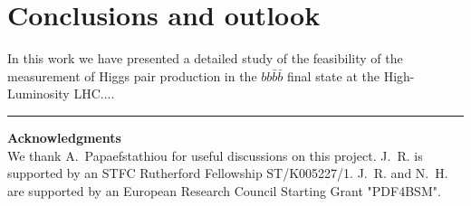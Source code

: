 \section{Conclusions and outlook}
\label{sec:conclusions}

In this work we have presented a detailed study of the feasibility
of the measurement of Higgs pair production in the $bb\bar{b}\bar{b}$
final state at the High-Luminosity LHC....




\bigskip
\bigskip
\begin{center}
\rule{5cm}{.1pt}
\end{center}
\bigskip
\bigskip

{\bf\noindent  Acknowledgments \\}
We thank A.~Papaefstathiou for useful discussions on this project.
%
J.~R. is supported by an STFC Rutherford Fellowship ST/K005227/1.
%
J.~R. and N.~H. are
supported by an European Research Council Starting Grant "PDF4BSM".
%
